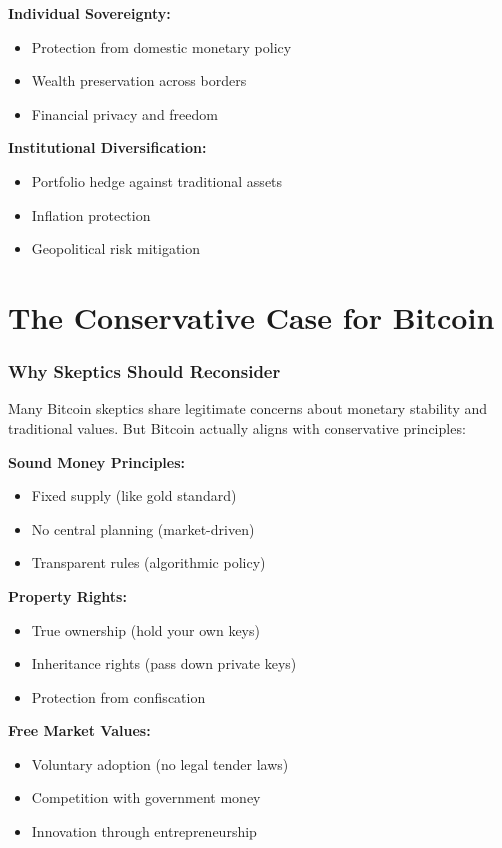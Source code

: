 \documentclass[11pt,oneside]{book}
\begin{document}
\textbf{Individual Sovereignty:}
\begin{itemize}
\item Protection from domestic monetary policy
\item Wealth preservation across borders
\item Financial privacy and freedom
\end{itemize}

\textbf{Institutional Diversification:}
\begin{itemize}
\item Portfolio hedge against traditional assets
\item Inflation protection
\item Geopolitical risk mitigation
\end{itemize}

\section{The Conservative Case for Bitcoin}

\subsubsection{Why Skeptics Should Reconsider}

Many Bitcoin skeptics share legitimate concerns about monetary stability and traditional values. But Bitcoin actually aligns with conservative principles:

\textbf{Sound Money Principles:}
\begin{itemize}
\item Fixed supply (like gold standard)
\item No central planning (market-driven)
\item Transparent rules (algorithmic policy)
\end{itemize}

\textbf{Property Rights:}
\begin{itemize}
\item True ownership (hold your own keys)
\item Inheritance rights (pass down private keys)
\item Protection from confiscation
\end{itemize}

\textbf{Free Market Values:}
\begin{itemize}
\item Voluntary adoption (no legal tender laws)
\item Competition with government money
\item Innovation through entrepreneurship
\end{itemize}
\end{document}
